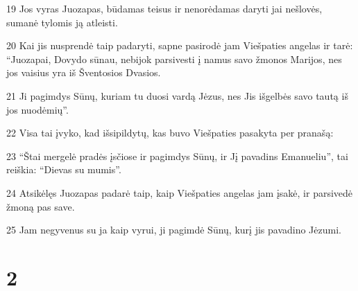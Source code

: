 \par 19 Jos vyras Juozapas, būdamas teisus ir nenorėdamas daryti jai nešlovės, sumanė tylomis ją atleisti. 
\par 20 Kai jis nusprendė taip padaryti, sapne pasirodė jam Viešpaties angelas ir tarė: “Juozapai, Dovydo sūnau, nebijok parsivesti į namus savo žmonos Marijos, nes jos vaisius yra iš Šventosios Dvasios. 
\par 21 Ji pagimdys Sūnų, kuriam tu duosi vardą Jėzus, nes Jis išgelbės savo tautą iš jos nuodėmių”. 
\par 22 Visa tai įvyko, kad išsipildytų, kas buvo Viešpaties pasakyta per pranašą: 
\par 23 “Štai mergelė pradės įsčiose ir pagimdys Sūnų, ir Jį pavadins Emanueliu”, tai reiškia: “Dievas su mumis”. 
\par 24 Atsikėlęs Juozapas padarė taip, kaip Viešpaties angelas jam įsakė, ir parsivedė žmoną pas save. 
\par 25 Jam negyvenus su ja kaip vyrui, ji pagimdė Sūnų, kurį jis pavadino Jėzumi.


\chapter{2}


